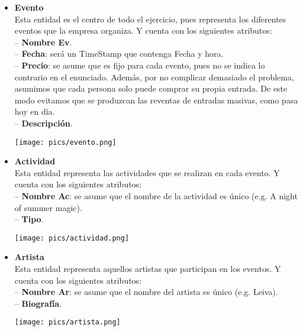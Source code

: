 \documentclass[12pt]{article}
\begin{document}
    \begin{itemize}

        \item \textbf{Evento}\\
            Esta entidad es el centro de todo el ejercicio, pues representa los diferentes eventos que la empresa organiza.
            Y cuenta con los siguientes atributos: \\
                \hspace{0.5cm} -- {\bfseries Nombre Ev}. \\
                \hspace{0.5cm} -- {\bfseries Fecha}: será un TimeStamp que contenga Fecha y hora. \\
                \hspace{0.5cm} -- {\bfseries Precio}: se asume que es fijo para cada evento, pues no se indica lo contrario en el enunciado. 
                Además, por no complicar demasiado el problema, asumimos que cada persona solo puede comprar su propia entrada. 
                De este modo evitamos que se produzcan las reventas de entradas masivas, como pasa hoy en día. \\
                \hspace{0.5cm} -- {\bfseries Descripción}.
            \begin{center}
            {\texttt{[image: pics/evento.png]}}
            \end{center}

        \item \textbf{Actividad}\\
            Esta entidad representa las actividades que se realizan en cada evento. 
            Y cuenta con los siguientes atributos:\\
                \hspace{0.5cm} -- {\bfseries Nombre Ac}: se asume que el nombre de la actividad es único (e.g. A night of summer magic). \\
                \hspace{0.5cm} -- {\bfseries Tipo}.
            \begin{center}
            {\texttt{[image: pics/actividad.png]}}
            \end{center}

        \item \textbf{Artista}\\
            Esta entidad representa aquellos artistas que participan en los eventos. 
            Y cuenta con los siguientes atributos: \\
                \hspace{0.5cm} -- {\bfseries Nombre Ar}: se asume que el nombre del artista es único (e.g. Leiva). \\
                \hspace{0.5cm} -- {\bfseries Biografía}.
            \begin{center}
            {\texttt{[image: pics/artista.png]}}
            \end{center}


\end{itemize}
\end{document}
